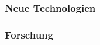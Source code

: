 \chapter{}
\label{sec:overview}


\subsection{Neue Technologien}

%
%

\subsection{Forschung}

	
	
	



